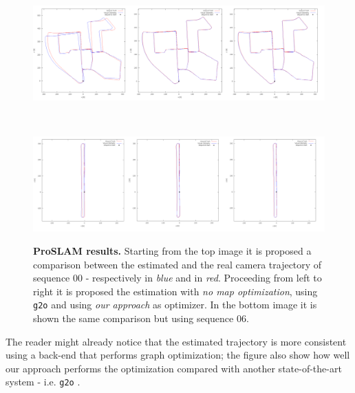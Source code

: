 \begin{figure}[!hbt]
    \centering
    \begin{minipage}[t!]{0.9\textwidth}
        \centering
        \includegraphics[width=\textwidth]{figures/use_cases/froslam_kitti00.png}
        \label{fig:froslam_kitti_00}
    \end{minipage}\\
    \begin{minipage}[t!]{0.9\textwidth}
        \centering
        \includegraphics[width=\textwidth]{figures/use_cases/froslam_kitti06.png}
        \label{fig:froslam_kitti_06}
    \end{minipage}%
    
    \caption{\textbf{ProSLAM results.} Starting from the top image it is proposed a comparison between the estimated and the real camera trajectory of sequence 00 - respectively in \textit{blue} and in \textit{red}. Proceeding from left to right it is proposed the estimation with \textit{no map optimization}, using \texttt{g2o} and using \textit{our approach} as optimizer. In the bottom image it is shown the same comparison but using sequence 06.} 
    \label{fig:froslam_kitti}
\end{figure}

\noindent The reader might already notice that the estimated trajectory is more consistent using a back-end that performs graph optimization; the figure also show how well our approach performs the optimization compared with another state-of-the-art system - i.e. \texttt{g2o} \cite{kummerle2011g}.


